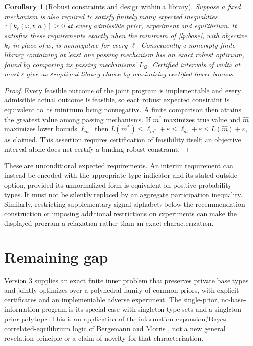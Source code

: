 \documentclass[11pt]{article}
\newtheorem{corollary}[theorem]{Corollary}
\theoremstyle{definition}
\theoremstyle{remark}
\begin{document}
\begin{corollary}[Robust constraints and design within a library]
Suppose a fixed mechanism is also required to satisfy finitely many
expected inequalities $\mathbb E[k_\ell(\omega,t,a)]\geq0$ at every
admissible prior, experiment and equilibrium. It satisfies these
requirements exactly when the minimum of \eqref{lp:base}, with objective
$k_\ell$ in place of $w$, is nonnegative for every $\ell$.
Consequently a nonempty finite library containing at least one passing
mechanism has an exact robust optimum, found by comparing its passing
mechanisms' $L_{\mathcal Q}$. Certified intervals of width at most
$\varepsilon$ give an $\varepsilon$-optimal library choice by maximizing
certified lower bounds.
\end{corollary}
\begin{proof}
Every feasible outcome of the joint program is implementable and every
admissible actual outcome is feasible, so each robust expected constraint
is equivalent to its minimum being nonnegative. A finite comparison
then attains the greatest value among passing mechanisms. If $m^*$
maximizes true value and $\hat m$ maximizes lower bounds $\ell_m$, then
$L(m^*)\leq\ell_{m^*}+\varepsilon\leq\ell_{\hat m}+\varepsilon
\leq L(\hat m)+\varepsilon$, as claimed. This assertion requires
certification of feasibility itself; an objective interval alone does
not certify a binding robust constraint.
\end{proof}

These are unconditional expected requirements. An interim requirement
can instead be encoded with the appropriate type indicator and its
stated outside option, provided its unnormalized form is equivalent
on positive-probability types. It must not be silently replaced by an
aggregate participation inequality. Similarly, restricting supplementary
signal alphabets below the recommendation construction or imposing
additional restrictions on experiments can make the displayed program
a relaxation rather than an exact characterization.

\section{Remaining gap}
Version 3 supplies an exact finite inner problem that preserves private
base types and jointly optimizes over a polyhedral family of common
priors, with explicit certificates and an implementable adverse
experiment. The single-prior, no-base-information program is its special
case with singleton type sets and a singleton prior polytope. This is
an application of the information-expansion/Bayes-correlated-equilibrium
logic of Bergemann and Morris \cite{BM}, not a new general revelation
principle or a claim of novelty for that characterization.
\end{document}
